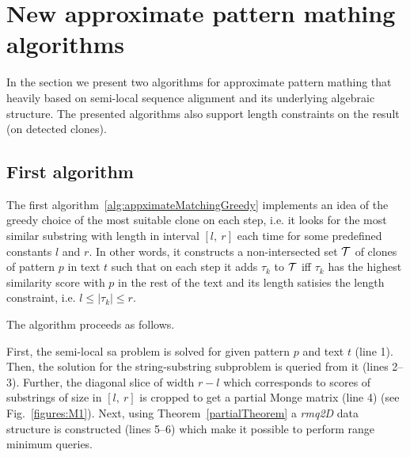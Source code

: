\section{New approximate pattern mathing algorithms}
\label{section:our}

In the section we present two algorithms for approximate pattern mathing that heavily based on semi-local sequence alignment and its underlying algebraic structure.
The presented algorithms also support length constraints on the result (on detected clones).

\subsection{First algorithm}
The first algorithm~\ref{alg:appximateMatchingGreedy} implements an idea of the greedy choice of the most suitable clone on each step, i.e. it looks for the most similar substring with length in interval $[l,\ r]$ each time for some predefined constants $l$ and $r$.
In other words, it constructs a non-intersected set ${\mathcal{T}}$ of clones of pattern $p$ in text $t$ such that on each step it adds $\tau_k$ to ${\mathcal{T}}$ iff $\tau_k$ has the highest similarity score with $p$ in the rest of the text and its length satisies the length constraint, i.e. $l \leq |\tau_k| \leq r$.

The algorithm proceeds as follows.

First, the semi-local sa problem is solved for given pattern $p$ and text $t$ (line 1).
Then, the solution for the string-substring subproblem is queried from it (lines 2--3).
Further, the diagonal slice of width $r-l$ which corresponds to scores of substrings of size in $[l,\ r]$ is cropped to get a partial Monge matrix (line 4) (see Fig.~\ref{figures:M1}).
Next, using Theorem~\ref{partialTheorem} a \emph{rmq2D} data structure is constructed (lines 5--6) which make it possible to perform range minimum queries.

